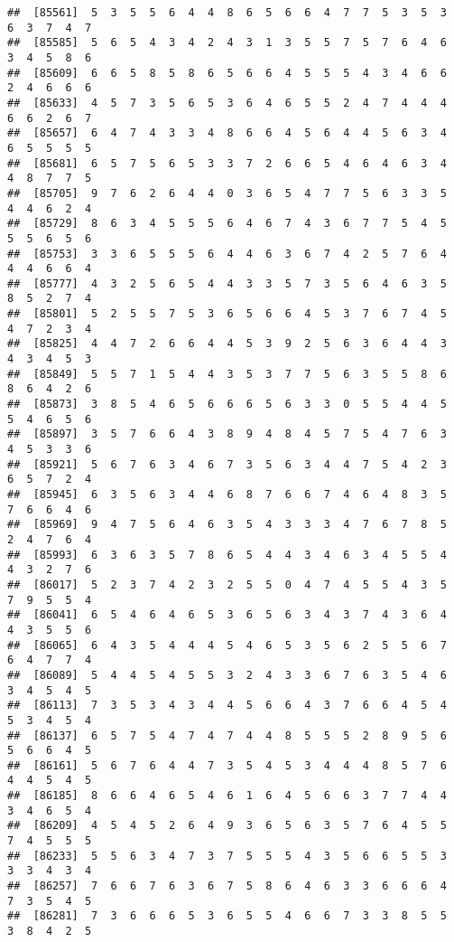 \documentclass[
]{book}
\begin{document}
\begin{verbatim}
##  [85561]  5  3  5  5  6  4  4  8  6  5  6  6  4  7  7  5  3  5  3  6  3  7  4  7
##  [85585]  5  6  5  4  3  4  2  4  3  1  3  5  5  7  5  7  6  4  6  3  4  5  8  6
##  [85609]  6  6  5  8  5  8  6  5  6  6  4  5  5  5  4  3  4  6  6  2  4  6  6  6
##  [85633]  4  5  7  3  5  6  5  3  6  4  6  5  5  2  4  7  4  4  4  6  6  2  6  7
##  [85657]  6  4  7  4  3  3  4  8  6  6  4  5  6  4  4  5  6  3  4  6  5  5  5  5
##  [85681]  6  5  7  5  6  5  3  3  7  2  6  6  5  4  6  4  6  3  4  4  8  7  7  5
##  [85705]  9  7  6  2  6  4  4  0  3  6  5  4  7  7  5  6  3  3  5  4  4  6  2  4
##  [85729]  8  6  3  4  5  5  5  6  4  6  7  4  3  6  7  7  5  4  5  5  5  6  5  6
##  [85753]  3  3  6  5  5  5  6  4  4  6  3  6  7  4  2  5  7  6  4  4  4  6  6  4
##  [85777]  4  3  2  5  6  5  4  4  3  3  5  7  3  5  6  4  6  3  5  8  5  2  7  4
##  [85801]  5  2  5  5  7  5  3  6  5  6  6  4  5  3  7  6  7  4  5  4  7  2  3  4
##  [85825]  4  4  7  2  6  6  4  4  5  3  9  2  5  6  3  6  4  4  3  4  3  4  5  3
##  [85849]  5  5  7  1  5  4  4  3  5  3  7  7  5  6  3  5  5  8  6  8  6  4  2  6
##  [85873]  3  8  5  4  6  5  6  6  6  5  6  3  3  0  5  5  4  4  5  5  4  6  5  6
##  [85897]  3  5  7  6  6  4  3  8  9  4  8  4  5  7  5  4  7  6  3  4  5  3  3  6
##  [85921]  5  6  7  6  3  4  6  7  3  5  6  3  4  4  7  5  4  2  3  6  5  7  2  4
##  [85945]  6  3  5  6  3  4  4  6  8  7  6  6  7  4  6  4  8  3  5  7  6  6  4  6
##  [85969]  9  4  7  5  6  4  6  3  5  4  3  3  3  4  7  6  7  8  5  2  4  7  6  4
##  [85993]  6  3  6  3  5  7  8  6  5  4  4  3  4  6  3  4  5  5  4  4  3  2  7  6
##  [86017]  5  2  3  7  4  2  3  2  5  5  0  4  7  4  5  5  4  3  5  7  9  5  5  4
##  [86041]  6  5  4  6  4  6  5  3  6  5  6  3  4  3  7  4  3  6  4  4  3  5  5  6
##  [86065]  6  4  3  5  4  4  4  5  4  6  5  3  5  6  2  5  5  6  7  6  4  7  7  4
##  [86089]  5  4  4  5  4  5  5  3  2  4  3  3  6  7  6  3  5  4  6  3  4  5  4  5
##  [86113]  7  3  5  3  4  3  4  4  5  6  6  4  3  7  6  6  4  5  4  5  3  4  5  4
##  [86137]  6  5  7  5  4  7  4  7  4  4  8  5  5  5  2  8  9  5  6  5  6  6  4  5
##  [86161]  5  6  7  6  4  4  7  3  5  4  5  3  4  4  4  8  5  7  6  4  4  5  4  5
##  [86185]  8  6  6  4  6  5  4  6  1  6  4  5  6  6  3  7  7  4  4  3  4  6  5  4
##  [86209]  4  5  4  5  2  6  4  9  3  6  5  6  3  5  7  6  4  5  5  7  4  5  5  5
##  [86233]  5  5  6  3  4  7  3  7  5  5  5  4  3  5  6  6  5  5  3  3  3  4  3  4
##  [86257]  7  6  6  7  6  3  6  7  5  8  6  4  6  3  3  6  6  6  4  7  3  5  4  5
##  [86281]  7  3  6  6  6  5  3  6  5  5  4  6  6  7  3  3  8  5  5  3  8  4  2  5

\end{verbatim}
\end{document}
